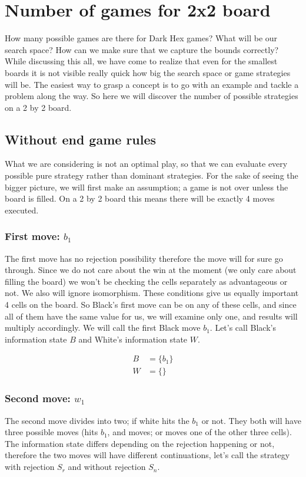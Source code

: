 \section{Number of games for 2x2 board}

How many possible games are there for Dark Hex games? What will be our search space? How can we make sure that we capture the bounds correctly? While discussing this all, we have come to realize that even for the smallest boards it is not visible really quick how big the search space or game strategies will be. The easiest way to grasp a concept is to go with an example and tackle a problem along the way. So here we will discover the number of possible strategies on a 2 by 2 board.

\subsection{Without end game rules}
What we are considering is not an optimal play, so that we can evaluate every possible pure strategy rather than dominant strategies. For the sake of seeing the bigger picture, we will first make an assumption; a game is not over unless the board is filled. On a 2 by 2 board this means there will be exactly 4 moves executed.

\subsubsection*{First move: $b_1$}
The first move has no rejection possibility therefore the move will for sure go through. Since we do not care about the win at the moment (we only care about filling the board) we won't be checking the cells separately as advantageous or not. We also will ignore isomorphism. These conditions give us equally important 4 cells on the board. So Black's first move can be on any of these cells, and since all of them have the same value for us, we will examine only one, and results will multiply accordingly. We will call the first Black move $b_1$. Let's call Black's information state $B$ and White's information state $W$.

\begin{align}
	B &= \{b_1\} \nonumber\\
	W &= \{\} \nonumber
\end{align}

\subsubsection*{Second move: $w_1$}
The second move divides into two; if white hits the $b_1$ or not. They both will have three possible moves (hits $b_1$, and moves; or moves one of the other three cells). The information state differs depending on the rejection happening or not, therefore the two moves will have different continuations, let's call the strategy with rejection $S_r$ and without rejection $S_n$. 

